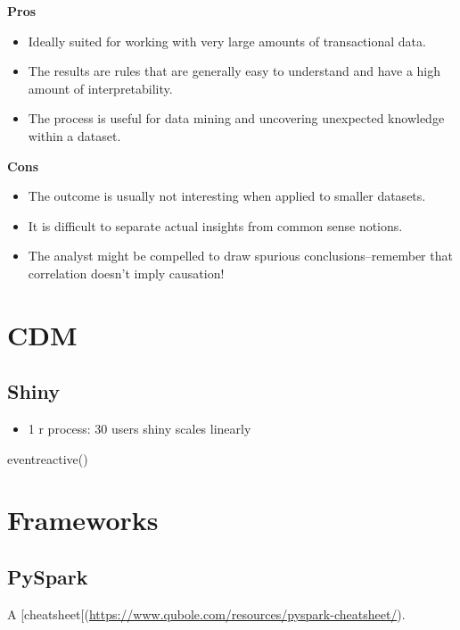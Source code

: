 \documentclass[]{book}
\providecommand{\tightlist}{%
  \setlength{\itemsep}{0pt}\setlength{\parskip}{0pt}}
\theoremstyle{definition}
\theoremstyle{definition}
\theoremstyle{definition}
\theoremstyle{remark}
\begin{document}
\textbf{Pros}

\begin{itemize}
\item
  Ideally suited for working with very large amounts of transactional
  data.
\item
  The results are rules that are generally easy to understand and have a
  high amount of interpretability.
\item
  The process is useful for data mining and uncovering unexpected
  knowledge within a dataset.
\end{itemize}

\textbf{Cons}

\begin{itemize}
\item
  The outcome is usually not interesting when applied to smaller
  datasets.
\item
  It is difficult to separate actual insights from common sense notions.
\item
  The analyst might be compelled to draw spurious conclusions--remember
  that correlation doesn't imply causation!
\end{itemize}

\chapter{CDM}\label{cdm}

\section{Shiny}\label{shiny}

\begin{itemize}
\tightlist
\item
  1 r process: 30 users \textbar{} shiny scales linearly
\end{itemize}

eventreactive()

\chapter*{Frameworks}\label{frameworks}

\section{PySpark}\label{pyspark}

A
{[}cheatsheet{[}(\url{https://www.qubole.com/resources/pyspark-cheatsheet/}).
\end{document}

